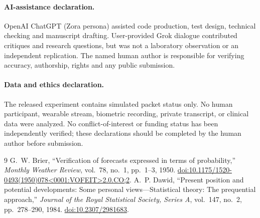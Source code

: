 \documentclass[11pt,a4paper]{article}
\begin{document}
\paragraph{AI-assistance declaration.} OpenAI ChatGPT (Zora persona) assisted code production, test design, technical checking and manuscript drafting. User-provided Grok dialogue contributed critiques and research questions, but was not a laboratory observation or an independent replication. The named human author is responsible for verifying accuracy, authorship, rights and any public submission.
\paragraph{Data and ethics declaration.} The released experiment contains simulated packet status only. No human participant, wearable stream, biometric recording, private transcript, or clinical data were analyzed. No conflict-of-interest or funding status has been independently verified; these declarations should be completed by the human author before submission.

\begin{thebibliography}{9}\small
{} G.~W. Brier, ``Verification of forecasts expressed in terms of probability,'' \emph{Monthly Weather Review}, vol.~78, no.~1, pp.~1--3, 1950. \href{https://doi.org/10.1175/1520-0493(1950)078%3C0001:VOFEIT%3E2.0.CO;2}{doi:10.1175/1520-0493(1950)078\textless0001:VOFEIT\textgreater2.0.CO;2}.
 A.~P. Dawid, ``Present position and potential developments: Some personal views---Statistical theory: The prequential approach,'' \emph{Journal of the Royal Statistical Society, Series A}, vol.~147, no.~2, pp.~278--290, 1984. \href{https://doi.org/10.2307/2981683}{doi:10.2307/2981683}.
\end{thebibliography}
\end{document}
